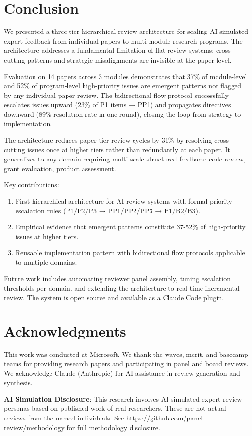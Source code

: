 \section{Conclusion}
\label{sec:conclusion}

We presented a three-tier hierarchical review architecture for scaling AI-simulated expert feedback from individual papers to multi-module research programs. The architecture addresses a fundamental limitation of flat review systems: cross-cutting patterns and strategic misalignments are invisible at the paper level.

Evaluation on 14 papers across 3 modules demonstrates that 37\% of module-level and 52\% of program-level high-priority issues are emergent patterns not flagged by any individual paper review. The bidirectional flow protocol successfully escalates issues upward (23\% of P1 items → PP1) and propagates directives downward (89\% resolution rate in one round), closing the loop from strategy to implementation.

The architecture reduces paper-tier review cycles by 31\% by resolving cross-cutting issues once at higher tiers rather than redundantly at each paper. It generalizes to any domain requiring multi-scale structured feedback: code review, grant evaluation, product assessment.

Key contributions:
\begin{enumerate}
\item First hierarchical architecture for AI review systems with formal priority escalation rules (P1/P2/P3 → PP1/PP2/PP3 → B1/B2/B3).
\item Empirical evidence that emergent patterns constitute 37-52\% of high-priority issues at higher tiers.
\item Reusable implementation pattern with bidirectional flow protocols applicable to multiple domains.
\end{enumerate}

Future work includes automating reviewer panel assembly, tuning escalation thresholds per domain, and extending the architecture to real-time incremental review. The system is open source and available as a Claude Code plugin.

\section*{Acknowledgments}

This work was conducted at Microsoft. We thank the waves, merit, and basecamp teams for providing research papers and participating in panel and board reviews. We acknowledge Claude (Anthropic) for AI assistance in review generation and synthesis.

\textbf{AI Simulation Disclosure}: This research involves AI-simulated expert review personas based on published work of real researchers. These are not actual reviews from the named individuals. See \url{https://github.com/panel-review/methodology} for full methodology disclosure.